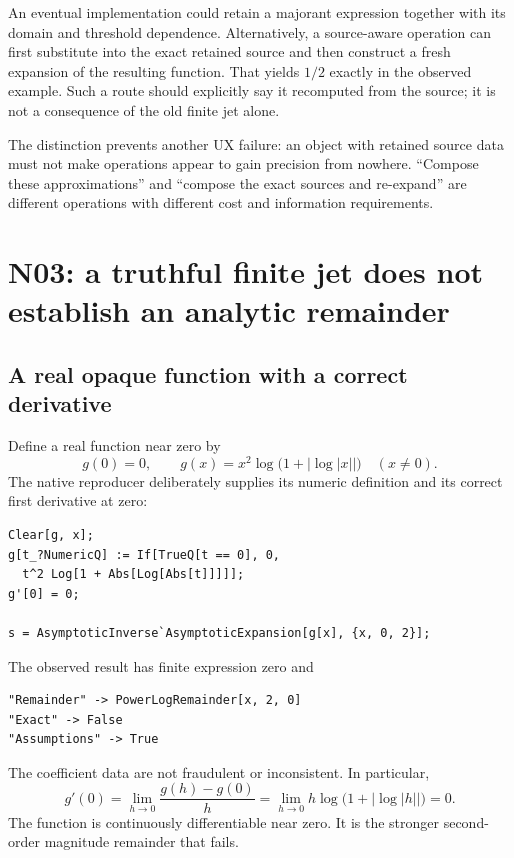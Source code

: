 \documentclass[11pt,letterpaper]{article}
\begin{document}
An eventual implementation could retain a majorant expression together with its domain and threshold dependence. Alternatively, a source-aware operation can first substitute into the exact retained source and then construct a fresh expansion of the resulting function. That yields $1/2$ exactly in the observed example. Such a route should explicitly say it recomputed from the source; it is not a consequence of the old finite jet alone.

The distinction prevents another UX failure: an object with retained source data must not make operations appear to gain precision from nowhere. ``Compose these approximations'' and ``compose the exact sources and re-expand'' are different operations with different cost and information requirements.

\section{N03: a truthful finite jet does not establish an analytic remainder}\label{sec:n03}
\subsection{A real opaque function with a correct derivative}
Define a real function near zero by
\begin{equation}\label{eq:gdef}
 g(0)=0,\qquad
 g(x)=x^2\log\bigl(1+|\log|x||\bigr)\quad(x\ne0).
\end{equation}
The native reproducer deliberately supplies its numeric definition and its correct first derivative at zero:
\begin{lstlisting}
Clear[g, x];
g[t_?NumericQ] := If[TrueQ[t == 0], 0,
  t^2 Log[1 + Abs[Log[Abs[t]]]]];
g'[0] = 0;

s = AsymptoticInverse`AsymptoticExpansion[g[x], {x, 0, 2}];
\end{lstlisting}
The observed result has finite expression zero and
\begin{lstlisting}
"Remainder" -> PowerLogRemainder[x, 2, 0]
"Exact" -> False
"Assumptions" -> True
\end{lstlisting}
The coefficient data are not fraudulent or inconsistent. In particular,
\begin{equation}
 g'(0)=\lim_{h\to0}\frac{g(h)-g(0)}h
      =\lim_{h\to0}h\log\bigl(1+|\log|h||\bigr)=0.
\end{equation}
The function is continuously differentiable near zero. It is the stronger second-order magnitude remainder that fails.
\end{document}
